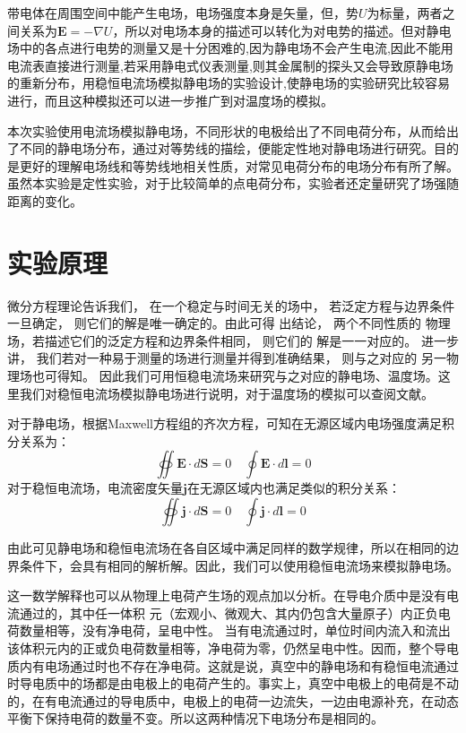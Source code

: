 \documentclass{WHUReport}
\begin{document}
\begin{multicols}{2}
	带电体在周围空间中能产生电场，电场强度本身是矢量，但，势$U$为标量，两者之间关系为$\mathbf{E}=-\nabla U$，所以对电场本身的描述可以转化为对电势的描述。但对静电场中的各点进行电势的测量又是十分困难的,因为静电场不会产生电流,因此不能用电流表直接进行测量,若采用静电式仪表测量,则其金属制的探头又会导致原静电场的重新分布，用稳恒电流场模拟静电场的实验设计,使静电场的实验研究比较容易进行，而且这种模拟还可以进一步推广到对温度场的模拟。
	
	本次实验使用电流场模拟静电场，不同形状的电极给出了不同电荷分布，从而给出了不同的静电场分布，通过对等势线的描绘，便能定性地对静电场进行研究。目的是更好的理解电场线和等势线地相关性质，对常见电荷分布的电场分布有所了解。虽然本实验是定性实验，对于比较简单的点电荷分布，实验者还定量研究了场强随距离的变化。
	\section{实验原理}
	微分方程理论告诉我们， 在一个稳定与时间无关的场中， 若泛定方程与边界条件一旦确定， 则它们的解是唯一确定的。由此可得 出结论， 两个不同性质的 物理场，若描述它们的泛定方程和边界条件相同， 则它们的 解是一一对应的。 进一步讲， 我们若对一种易于测量的场进行测量并得到准确结果， 则与之对应的 另一物理场也可得知。 因此我们可用恒稳电流场来研究与之对应的静电场、温度场。这里我们对稳恒电流场模拟静电场进行说明，对于温度场的模拟可以查阅文献。
	
	对于静电场，根据Maxwell方程组的齐次方程，可知在无源区域内电场强度满足积分关系为：
	\begin{equation}
		\oiint \mathbf{E}\cdot d\mathbf{S}=0\quad\oint \mathbf{E}\cdot d\mathbf{l}=0
	\end{equation}
	对于稳恒电流场，电流密度矢量$\mathbf{j}$在无源区域内也满足类似的积分关系：
	\begin{equation}
		\oiint \mathbf{j}\cdot d\mathbf{S}=0\quad\oint \mathbf{j}\cdot d\mathbf{l}=0
	\end{equation}
	
	由此可见静电场和稳恒电流场在各自区域中满足同样的数学规律，所以在相同的边界条件下，会具有相同的解析解。因此，我们可以使用稳恒电流场来模拟静电场。
	
	这一数学解释也可以从物理上电荷产生场的观点加以分析。在导电介质中是没有电流通过的，其中任一体积	元（宏观小、微观大、其内仍包含大量原子）内正负电荷数量相等，没有净电荷，呈电中性。	当有电流通过时，单位时间内流入和流出该体积元内的正或负电荷数量相等，净电荷为零，仍然呈电中性。因而，整个导电质内有电场通过时也不存在净电荷。这就是说，真空中的静电场和有稳恒电流通过时导电质中的场都是由电极上的电荷产生的。事实上，真空中电极上的电荷是不动的，在有电流通过的导电质中，电极上的电荷一边流失，一边由电源补充，在动态平衡下保持电荷的数量不变。所以这两种情况下电场分布是相同的。
	

\end{multicols}
\end{document}
